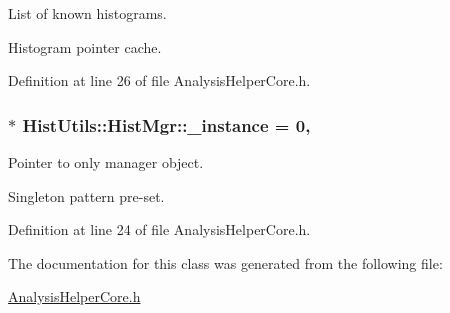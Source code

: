 List of known histograms. 

Histogram pointer cache. 

Definition at line 26 of file Analysis\+Helper\+Core.\+h.

\subsubsection[{\texorpdfstring{\+\_\+instance}{_instance}}]{ $\ast$ Hist\+Utils\+::\+Hist\+Mgr\+::\+\_\+instance = 0\hspace{0.3cm}{\ttfamily [static]}, {\ttfamily [private]}}\hypertarget{classHistUtils_1_1HistMgr_a9941e8757f5e3dabfc24422822857fe6}{}\label{classHistUtils_1_1HistMgr_a9941e8757f5e3dabfc24422822857fe6}


Pointer to only manager object. 

Singleton pattern pre-\/set. 

Definition at line 24 of file Analysis\+Helper\+Core.\+h.



The documentation for this class was generated from the following file\+:\begin{DoxyCompactItemize}
\item 
\hyperlink{AnalysisHelperCore_8h}{Analysis\+Helper\+Core.\+h}\end{DoxyCompactItemize}

